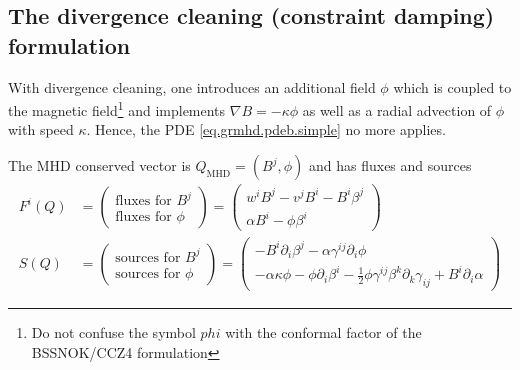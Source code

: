 \documentclass[a4paper]{article}
\newcommand{\desc}[1]{\text{#1}\quad}
\newcommand{\mhd}{\text{MHD}}
\begin{document}
\subsection{The divergence cleaning (constraint damping) formulation}

With divergence cleaning, one introduces an additional field $\phi$
which is coupled to the magnetic field\footnote{Do not confuse the
symbol $phi$ with the conformal factor of the BSSNOK/CCZ4 formulation}
and implements $\nabla B = - \kappa \phi$ as well as a radial advection
of $\phi$ with speed $\kappa$.
Hence, the PDE \eqref{eq.grmhd.pdeb.simple} no more applies.

The MHD conserved vector is $Q_\mhd = (B^j, \phi)$ and has
fluxes and sources
\begin{align}
F^i(Q) &= \begin{pmatrix}
\text{fluxes for }B^j \\
\text{fluxes for }\phi
\end{pmatrix}
=
\begin{pmatrix}
w^i B^j - v^j B^i - B^i \beta^j \\
\alpha B^i - \phi \beta^i
\end{pmatrix}
\\
S(Q) &=
\begin{pmatrix}
\text{sources for } B^j \\
\text{sources for } \phi
\end{pmatrix}
=
\begin{pmatrix}
-B^i \partial_i \beta^j - \alpha \gamma^{ij} \partial_i \phi \\
- \alpha \kappa \phi - \phi \partial_i \beta^i
- \frac 12 \phi \gamma^{ij} \beta^k \partial_k \gamma_{ij}
+ B^i \partial_i \alpha
\end{pmatrix}
\end{align}
%
\end{document}
